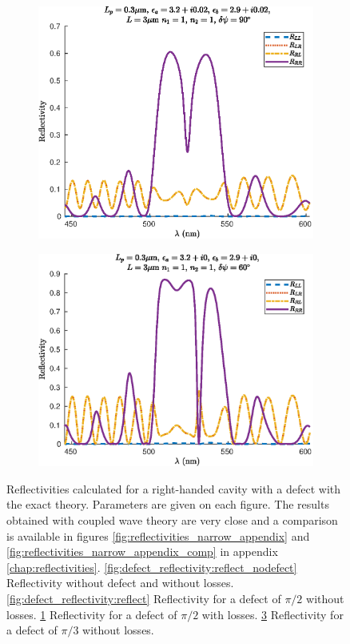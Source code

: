 \begin{figure}
	\begin{subfigure}{0.49\linewidth}
		\includegraphics[width=\linewidth]{plots/defect/reflectivity_losses/oseen_reflection}
		\caption{}
		\label{fig:defect_reflectivity:reflect_losses}
	\end{subfigure}
	\begin{subfigure}{0.49\linewidth}
		\includegraphics[width=\linewidth]{plots/defect/reflectivity_other_defect/oseen_reflection}
		\caption{}
		\label{fig:defect_reflectivity:reflect_other}
	\end{subfigure}
	\caption[Reflectivity of the narrow-band filter]{Reflectivities calculated for a right-handed cavity with a defect with the exact theory. Parameters are given on each figure. The results obtained with coupled wave theory are very close and a comparison is available in figures \ref{fig:reflectivities_narrow_appendix} and \ref{fig:reflectivities_narrow_appendix_comp} in appendix \ref{chap:reflectivities}. \ref{fig:defect_reflectivity:reflect_nodefect} Reflectivity without defect and without losses. \ref{fig:defect_reflectivity:reflect} Reflectivity for a defect of $\pi/2$ without losses. \ref{fig:defect_reflectivity:reflect_losses} Reflectivity for a defect of $\pi/2$ with losses. \ref{fig:defect_reflectivity:reflect_other} Reflectivity for a defect of $\pi/3$ without losses.}

\end{figure}
